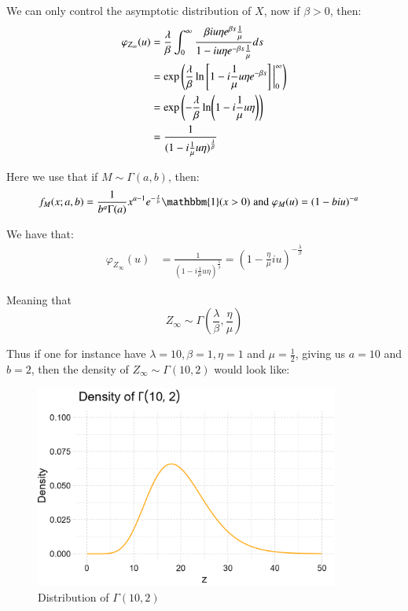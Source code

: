 We can only control the asymptotic distribution of $X$, now if $\beta > 0$, then:  
\begin{align*}
\varphi_{Z_{\infty}}(u) &= 
\frac{\lambda}{\beta}
\int_{0}^{\infty} 
\frac{
\beta iu\eta e^{\beta s}\frac{1}{\mu}
}{
1-iu\eta e^{-\beta s} \frac{1}{\mu}
}ds \\ 
&= 
\exp\left(
\frac{\lambda}{\beta}\ln\left[
1- i\frac{1}{\mu}u\eta e^{-\beta s}
\right]\bigg{|}_{0}^{\infty}
\right) \\ 
&= 
\exp\left(
-\frac{\lambda}{\beta}\ln(1-i\frac{1}{\mu}u\eta)
\right) \\ 
&= 
\frac{1}{
(1-i\frac{1}{\mu}u\eta)^{\frac{\lambda}{\beta}}
}
\end{align*}

Here we use that if $M \sim \Gamma(a,b)$, then: 
\begin{align*}
f_{M}(x;a,b) &= \frac{1}{b^{a}\Gamma(a)}x^{a-1}e^{-\frac{x}{b}}\mathbbm{1}(x>0)\;\text{and}\; 
\varphi_{M}(u) = (1-biu)^{-a}
\end{align*}

We have that: 
\begin{align*}
\varphi_{Z_{\infty}}(u) &= 
\frac{1}{
(1-i\frac{1}{\mu}u\eta)^{\frac{\lambda}{\beta}}
}
= 
\left(
1 - \frac{\eta}{\mu}iu
\right)^{-\frac{\lambda}{\beta}}
\end{align*}

Meaning that
\[
Z_{\infty} \sim \Gamma\left(
\frac{\lambda}{\beta}, \frac{\eta}{\mu}
\right)
\]

Thus if one for instance have $\lambda = 10, \beta = 1, \eta = 1$ and $\mu = \frac{1}{2}$, giving us $a = 10$ and $b= 2$, then the density of $Z_{\infty}\sim \Gamma(10,2)$ would look like:

\begin{figure}[htp]
    \centering
    \includegraphics[width=10cm]{figures/ESG/gamma_limiting_dist.png}
    \caption{Distribution of $\Gamma(10, 2)$}
    \label{fig: gamma_limiting_dist}
\end{figure}

